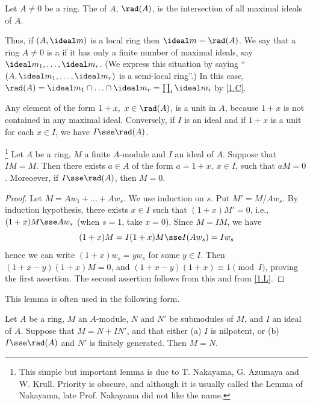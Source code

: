\documentclass[../main]{subfiles}
\begin{document}
\begin{pardefinition}
Let $A\ne0$ be a ring. The  of $A$, $\rad(A)$, is the intersection of all maximal ideals of $A$.
\end{pardefinition}

Thus, if $(A,\ideal m)$ is a local ring then $\ideal m=\rad(A)$. We say that a ring $A\ne0$ is a  if it has only a finite number of maximal ideals, say $\ideal m_1,\ldots,\ideal m_r$. (We express this situation by saying ``$(A,\ideal m_1,\ldots,\ideal m_r)$ is a semi-local ring''.) In this case, $\rad(A)=\ideal m_1\cap\ldots\cap\ideal m_r=\prod_i\ideal m_i$ by \ref{1.C}.

Any element of the form $1+x,~x\in\rad(A)$, is a unit in $A$, because $1+x$ is not contained in any maximal ideal. Conversely, if $I$ is an ideal and if $1+x$ is a unit for each $x\in I$, we have $I\sse\rad(A)$.

\begin{parlemma}[NAK]\label{lem:01.03}\label{NAK}\footnote{This simple but important lemma is due to T. Nakayama, G. Azumaya and W. Krull. Priority is obscure, and although it is usually called the Lemma of Nakayama, late Prof. Nakayama did not like the name.}
Let $A$ be a ring, $M$ a finite $A$-module and $I$ an ideal of $A$. Suppose that $IM=M$. Then there exists $a\in A$ of the form $a=1+x,~x\in I$, such that $aM=0$. Moreoever, if $I\sse\rad(A)$, then $M=0$.
\end{parlemma}

\begin{proof}
Let $M=Aw_1+\ldots+Aw_s$. We use induction on $s$. Put $M'=M/Aw_s$. By induction hypothesis, there exists $x\in I$ such that $(1+x)M'=0$, i.e., \newline $(1+x)M\sse Aw_s$ (when $s=1$, take $x=0$). Since $M=IM$, we have
\[(1+x)M = I(1+x)M \sse I(Aw_s) = Iw_s\]
hence we can write $(1+x)w_s=yw_s$ for some $y\in I$. Then $(1+x-y)(1+x)M=0$, and $(1+x-y)(1+x)\equiv 1\pmod{I}$, proving the first assertion. The second assertion follows from this and from \ref{1.L}.
\end{proof}

This lemma is often used in the following form.

\begin{corollary}\label{cor:01.01}
Let $A$ be a ring, $M$ an $A$-module, $N$ and $N'$ be submodules of $M$, and $I$ an ideal of $A$. Suppose that $M=N+IN'$, and that either (a) $I$ is nilpotent, or (b) $I\sse\rad(A)$ and $N'$ is finitely generated. Then $M=N$.
\end{corollary}
\end{document}
